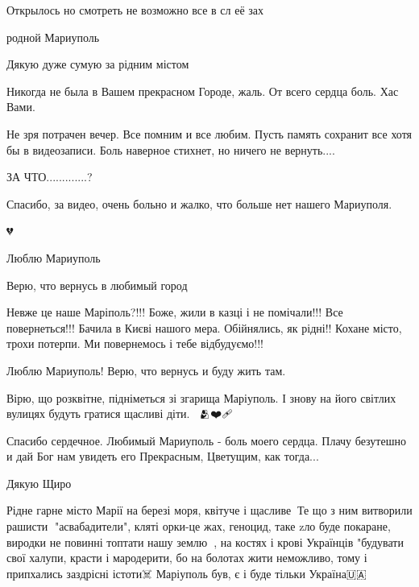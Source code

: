 
Открылось но смотреть не возможно все в сл её зах


родной Мариуполь


Дякую дуже сумую за рідним містом 🙏🏿🙏🏿🙏🏿


Никогда не была в Вашем прекрасном Городе, жаль. От всего сердца боль. Хас Вами.


Не зря потрачен вечер. Все помним и все любим. Пусть память сохранит все хотя
бы в видеозаписи. Боль наверное стихнет, но ничего не вернуть....


ЗА ЧТО.............?


Спасибо, за видео, очень больно и жалко, что больше нет нашего Мариуполя.

💔


Люблю Мариуполь


Верю, что вернусь в любимый город


Невже це наше Маріполь?!!! Боже, жили в казці і не помічали!!! Все
повернеться!!! Бачила в Києві нашого мера. Обійнялись, як рідні!! Кохане місто,
трохи потерпи. Ми повернемось і тебе відбудуємо!!!


Люблю Мариуполь! Верю, что вернусь и буду жить там.


Вірю, що розквітне, підніметься зі згарища Маріуполь. І знову на його світлих
вулицях будуть гратися щасливі діти.💙💛🙏🫂❤️🩹


Спасибо сердечное. Любимый Мариуполь - боль моего сердца. Плачу безутешно и дай
Бог нам увидеть его Прекрасным, Цветущим, как тогда...


Дякую Щиро


Рідне гарне місто Марії на березі моря, квітуче і щасливе💛💙Те що з ним
витворили рашисти👹 "асвабадители", кляті орки-це жах, геноцид, таке zло буде
покаране, виродки не повинні топтати нашу землю💛💙, на костях і крові
Українців "будувати свої халупи, красти і мародерити, бо на болотах жити
неможливо, тому і припхались заздрісні істоти☠️ Маріуполь був, є і буде тільки
Україна🇺🇦💛💙

